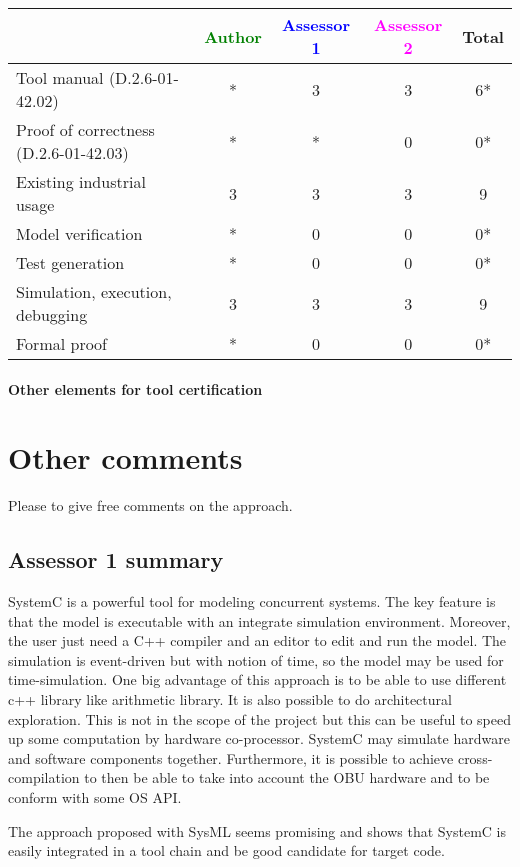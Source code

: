 \begin{tabular}{|l | c | c | c | c|}
\hline
& \textcolor{green}{Author} & \textcolor{blue}{Assessor 1} & \textcolor{magenta}{Assessor 2} & Total \\
\hline
Tool manual (D.2.6-01-42.02) & * &3 &3 & 6* \\
\hline
Proof of correctness (D.2.6-01-42.03) & * & * &0 & 0* \\
\hline
Existing industrial usage &3 &3 &3 & 9\\
\hline
Model verification & * &0 &0 & 0*\\
\hline
Test generation & * &0 &0 & 0*\\
\hline
Simulation, execution, debugging &3 &3 &3 & 9 \\
\hline
Formal proof &*  &0 &0 & 0* \\
\hline
\end{tabular}

\paragraph{Other elements for tool certification}

\section{Other comments}
Please to give free comments on the approach.

\subsection{Assessor 1 summary}
SystemC is a powerful tool for modeling concurrent systems. The key
feature is that the model is executable with  an integrate simulation
environment. Moreover, the user just need a C++ compiler and an editor
to edit and run the model. 
The simulation is event-driven but with notion of time, so the model
may be used for time-simulation.
One big advantage of this approach is to be able to use different c++
library like arithmetic library. It is also possible to do
architectural exploration. This is not in the scope of the project but
this can be useful to speed up some computation by hardware
co-processor. SystemC may simulate hardware and software components together.
Furthermore, it is possible to achieve cross-compilation to then be able
to take into account the OBU hardware and to be conform with some OS
API.

The approach proposed with SysML seems promising and shows that
SystemC is easily integrated in a tool chain and be good candidate for
target code.

